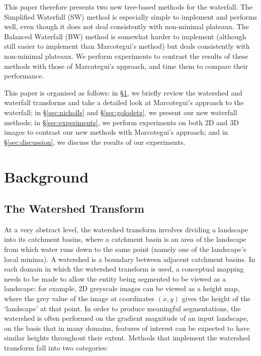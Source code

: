 \documentclass[preprint,a4paper]{elsarticle}
\begin{document}

This paper therefore presents two new tree-based methods for the waterfall. The Simplified Waterfall (SW) method is especially simple to implement and performs well, even though it does not deal consistently with non-minimal plateaux. The Balanced Waterfall (BW) method is somewhat harder to implement (although still easier to implement than Marcotegui's method) but deals consistently with non-minimal plateaux. We perform experiments to contrast the results of these methods with those of Marcotegui's approach, and time them to compare their performance.

This paper is organised as follows: in \S\ref{sec:background}, we briefly review the watershed and waterfall transforms and take a detailed look at Marcotegui's approach to the waterfall; in \S\ref{sec:nicholls} and \S\ref{sec:golodetz}, we present our new waterfall methods; in \S\ref{sec:experiments}, we perform experiments on both 2D and 3D images to contrast our new methods with Marcotegui's approach; and in \S\ref{sec:discussion}, we discuss the results of our experiments.

\section{Background}
\label{sec:background}

\subsection{The Watershed Transform}

At a very abstract level, the watershed transform involves dividing a landscape into its catchment basins, where a catchment basin is an area of the landscape from which water runs down to the same point (namely one of the landscape's local minima). A watershed is a boundary between adjacent catchment basins. In each domain in which the watershed transform is used, a conceptual mapping needs to be made to allow the entity being segmented to be viewed as a landscape: for example, 2D greyscale images can be viewed as a height map, where the grey value of the image at coordinates $(x,y)$ gives the height of the `landscape' at that point. In order to produce meaningful segmentations, the watershed is often performed on the gradient magnitude of an input landscape, on the basis that in many domains, features of interest can be expected to have similar heights throughout their extent. Methods that implement the watershed transform fall into two categories:
\end{document}
